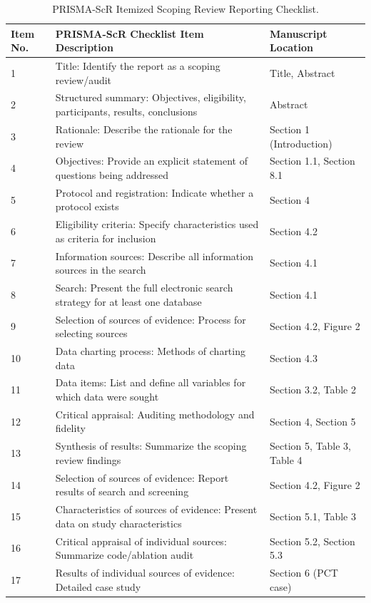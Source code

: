 \documentclass[3p,times]{elsarticle}
\begin{document}
\begin{table}[h]
\centering
\small
\caption{PRISMA-ScR Itemized Scoping Review Reporting Checklist.}
\label{tab:supp_prismascr}
\begin{tabularx}{\textwidth}{lXl}
\toprule
\textbf{Item No.} & \textbf{PRISMA-ScR Checklist Item Description} & \textbf{Manuscript Location} \\
\midrule
1 & Title: Identify the report as a scoping review/audit & Title, Abstract \\
2 & Structured summary: Objectives, eligibility, participants, results, conclusions & Abstract \\
3 & Rationale: Describe the rationale for the review & Section 1 (Introduction) \\
4 & Objectives: Provide an explicit statement of questions being addressed & Section 1.1, Section 8.1 \\
5 & Protocol and registration: Indicate whether a protocol exists & Section 4 \\
6 & Eligibility criteria: Specify characteristics used as criteria for inclusion & Section 4.2 \\
7 & Information sources: Describe all information sources in the search & Section 4.1 \\
8 & Search: Present the full electronic search strategy for at least one database & Section 4.1 \\
9 & Selection of sources of evidence: Process for selecting sources & Section 4.2, Figure 2 \\
10 & Data charting process: Methods of charting data & Section 4.3 \\
11 & Data items: List and define all variables for which data were sought & Section 3.2, Table 2 \\
12 & Critical appraisal: Auditing methodology and fidelity & Section 4, Section 5 \\
13 & Synthesis of results: Summarize the scoping review findings & Section 5, Table 3, Table 4 \\
14 & Selection of sources of evidence: Report results of search and screening & Section 4.2, Figure 2 \\
15 & Characteristics of sources of evidence: Present data on study characteristics & Section 5.1, Table 3 \\
16 & Critical appraisal of individual sources: Summarize code/ablation audit & Section 5.2, Section 5.3 \\
17 & Results of individual sources of evidence: Detailed case study & Section 6 (PCT case) \\

\end{tabularx}
\end{table}
\end{document}
